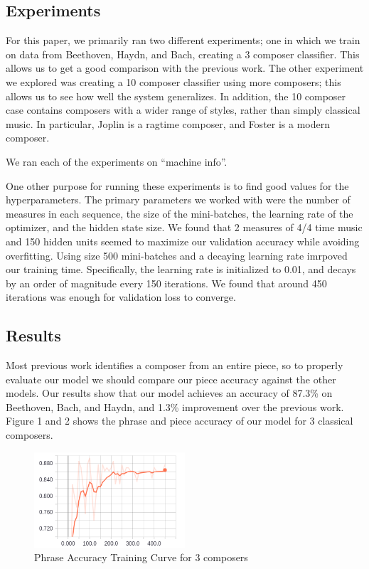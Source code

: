 \documentclass[11pt,a4paper]{article}
\begin{document}
\subsection{Experiments}
For this paper, we primarily ran two different experiments; one in which we train on data from Beethoven, Haydn, and Bach, creating a 3 composer classifier. This allows us to get a good comparison with the previous work. The other experiment we explored was creating a 10 composer classifier using more composers; this allows us to see how well the system generalizes. In addition, the 10 composer case contains composers with a wider range of styles, rather than simply classical music. In particular, Joplin is a ragtime composer, and Foster is a modern composer.

We ran each of the experiments on ``machine info''.

One other purpose for running these experiments is to find good values for the hyperparameters. The primary parameters we worked with were the number of measures in each sequence, the size of the mini-batches, the learning rate of the optimizer, and the hidden state size. We found that 2 measures of 4/4 time music and 150 hidden units seemed to maximize our validation accuracy while avoiding overfitting. Using size 500 mini-batches and a decaying learning rate imrpoved our training time. Specifically, the learning rate is initialized to 0.01, and decays by an order of magnitude every 150 iterations. We found that around 450 iterations was enough for validation loss to converge.


\subsection{Results}
Most previous work identifies a composer from an entire piece, so to properly evaluate our model we should compare our piece accuracy against the other models. Our results show that our model achieves an accuracy of 87.3\% on Beethoven, Bach, and Haydn, and 1.3\% improvement over the previous work. %
Figure 1 and 2 shows the phrase and piece accuracy of our model for 3 classical composers.

\begin{figure}[h]
\caption{Phrase Accuracy Training Curve for 3 composers}
\centering
\includegraphics[width=0.5\textwidth]{3_com_phrase.png}
\end{figure}
\end{document}
